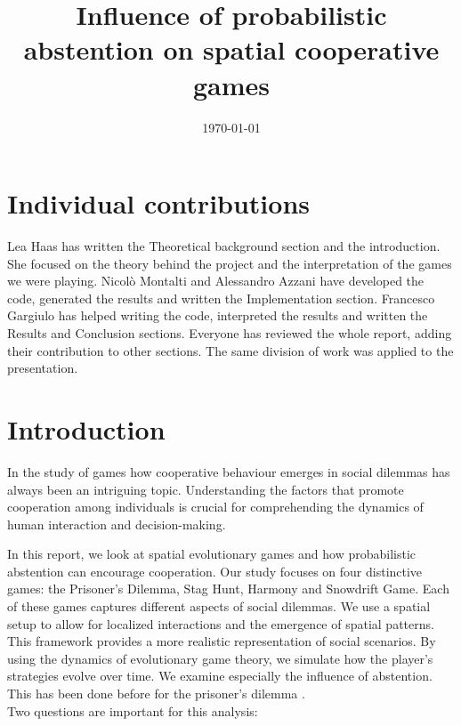 \documentclass[12pt,oneside,a4paper,fleqn]{article}
\title{Influence of probabilistic abstention on spatial cooperative games}
\date{\today}
\begin{document}
\maketitle 							%

\tableofcontents
\newpage




\pagestyle{fancy}               	%
\setlength{\parindent}{20pt}

\section*{Individual contributions}
\label{chap:indv}

Lea Haas has written the Theoretical background section and the introduction. She focused on the theory behind the project and the interpretation of the games we were playing. Nicolò Montalti and Alessandro Azzani have developed the code, generated the results and written the Implementation section. Francesco Gargiulo has helped writing the code, interpreted the results and written the Results and Conclusion sections. Everyone has reviewed the whole report, adding their contribution to other sections. The same division of work was applied to the presentation.

\newpage
{}
\section*{Introduction}
\label{chap:intro}

In the study of games how cooperative behaviour emerges in social dilemmas has always been an intriguing topic. Understanding the factors that promote cooperation among individuals is crucial for comprehending the dynamics of human interaction and decision-making.

In this report, we look at spatial evolutionary games and how probabilistic abstention can encourage cooperation. Our study focuses on four distinctive games: the Prisoner's Dilemma, Stag Hunt, Harmony and Snowdrift Game. Each of these games captures different aspects of social dilemmas. We use a spatial setup to allow for localized interactions and the emergence of spatial patterns. This framework provides a more realistic representation of social scenarios. By using the dynamics of evolutionary game theory, we simulate how the player's strategies evolve over time. We examine especially the influence of abstention. This has been done before for the prisoner's dilemma \cite{cardinot2018}. \\Two questions are important for this analysis:
\end{document}
